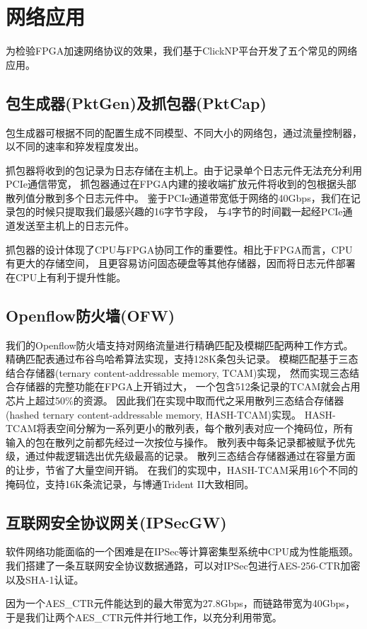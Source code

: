 \chapter{网络应用}
为检验FPGA加速网络协议的效果，我们基于ClickNP平台开发了五个常见的网络应用。

\section{包生成器(PktGen)及抓包器(PktCap)}
包生成器可根据不同的配置生成不同模型、不同大小的网络包，通过流量控制器，以不同的速率和猝发程度发出。

抓包器将收到的包记录为日志存储在主机上。由于记录单个日志元件无法充分利用PCIe通信带宽，
抓包器通过在FPGA内建的接收端扩放元件将收到的包根据头部散列值分散到多个日志元件中。
鉴于PCIe通道带宽低于网络的40Gbps，我们在记录包的时候只提取我们最感兴趣的16字节字段，
与4字节的时间戳一起经PCIe通道发送至主机上的日志元件。

抓包器的设计体现了CPU与FPGA协同工作的重要性。相比于FPGA而言，CPU有更大的存储空间，
且更容易访问固态硬盘等其他存储器，因而将日志元件部署在CPU上有利于提升性能。

\section{Openflow防火墙(OFW)}
我们的Openflow防火墙支持对网络流量进行精确匹配及模糊匹配两种工作方式。
精确匹配表通过布谷鸟哈希算法实现，支持128K条包头记录。
模糊匹配基于三态结合存储器(ternary content-addressable memory, TCAM)实现，
然而实现三态结合存储器的完整功能在FPGA上开销过大，
一个包含512条记录的TCAM就会占用芯片上超过50\%的资源。
因此我们在实现中取而代之采用散列三态结合存储器(hashed ternary content-addressable memory, HASH-TCAM)实现。
HASH-TCAM将表空间分解为一系列更小的散列表，每个散列表对应一个掩码位，所有输入的包在散列之前都先经过一次按位与操作。
散列表中每条记录都被赋予优先级，通过仲裁逻辑选出优先级最高的记录。
散列三态结合存储器通过在容量方面的让步，节省了大量空间开销。
在我们的实现中，HASH-TCAM采用16个不同的掩码位，支持16K条流记录，与博通Trident II大致相同。

\section{互联网安全协议网关(IPSecGW)}
软件网络功能面临的一个困难是在IPSec等计算密集型系统中CPU成为性能瓶颈。
我们搭建了一条互联网安全协议数据通路，可以对IPSec包进行AES-256-CTR加密以及SHA-1认证。

因为一个AES\_CTR元件能达到的最大带宽为27.8Gbps，而链路带宽为40Gbps，
于是我们让两个AES\_CTR元件并行地工作，以充分利用带宽。

